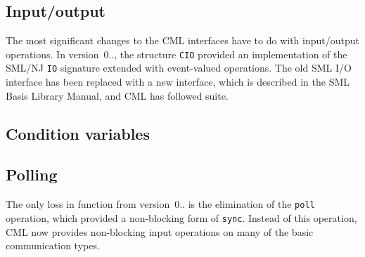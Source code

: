 \subsection{Input/output}


The most significant changes to the CML interfaces have to do with input/output operations.\- In version~0.., the structure \texttt{CIO} provided an implementation of the SML/NJ \texttt{IO} signature extended with event-valued operations.\- The old SML I/O interface has been replaced with a new interface, which is described in the SML Basis Library Manual, and CML has followed suite.\-\subsection{Condition variables}
\subsection{Polling}


The only loss in function from version~0.. is the elimination of the \texttt{poll} operation, which provided a non-blocking form of \texttt{sync}.\- Instead of this operation, CML now provides non-blocking input operations on many of the basic communication types.\-
